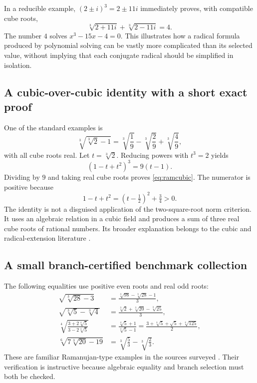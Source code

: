 \documentclass[11pt,letterpaper]{article}
\numberwithin{equation}{section}
\theoremstyle{definition}
\theoremstyle{remark}
\begin{document}
In a reducible example, $(2\pm i)^3=2\pm11i$ immediately proves, with compatible cube roots,
\[
\sqrt[3]{2+11i}+\sqrt[3]{2-11i}=4.
\]
The number $4$ solves $x^3-15x-4=0$. This illustrates how a radical formula produced by polynomial solving can be vastly more complicated than its selected value, without implying that each conjugate radical should be simplified in isolation.

\subsection{A cubic-over-cubic identity with a short exact proof}
One of the standard examples is
\begin{equation}\label{eq:ramcubic}
\sqrt[3]{\sqrt[3]2-1}
=\sqrt[3]{\frac19}-\sqrt[3]{\frac29}+\sqrt[3]{\frac49},
\end{equation}
with all cube roots real. Let $t=\sqrt[3]2$. Reducing powers with $t^3=2$ yields
\[
(1-t+t^2)^3=9(t-1).
\]
Dividing by $9$ and taking real cube roots proves \eqref{eq:ramcubic}. The numerator is positive because
\[
1-t+t^2=(t-\tfrac12)^2+\tfrac34>0.
\]
The identity is not a disguised application of the two-square-root norm criterion. It uses an algebraic relation in a cubic field and produces a sum of three real cube roots of rational numbers. Its broader explanation belongs to the cubic and radical-extension literature \cite{berndt98,krepkii,antipov,honsbeek}.

\subsection{A small branch-certified benchmark collection}
The following equalities use positive even roots and real odd roots:
\begin{align}
\sqrt{\sqrt[3]{28}-3}
&=\frac{\sqrt[3]{98}-\sqrt[3]{28}-1}{3},\label{eq:ram28}\\
\sqrt{\sqrt[3]5-\sqrt[3]4}
&=\frac{\sqrt[3]2+\sqrt[3]{20}-\sqrt[3]{25}}{3},\label{eq:ram5}\\
\sqrt[4]{\frac{3+2\sqrt[4]5}{3-2\sqrt[4]5}}
&=\frac{\sqrt[4]5+1}{\sqrt[4]5-1}
=\frac{3+\sqrt[4]5+\sqrt5+\sqrt[4]{125}}2,\label{eq:ram4}\\
\sqrt[6]{7\sqrt[3]{20}-19}
&=\sqrt[3]{\frac53}-\sqrt[3]{\frac23}.\label{eq:ram6}
\end{align}
These are familiar Ramanujan-type examples in the sources surveyed \cite{berndt,honsbeek,sury,osler}. Their verification is instructive because algebraic equality and branch selection must both be checked.
\end{document}

